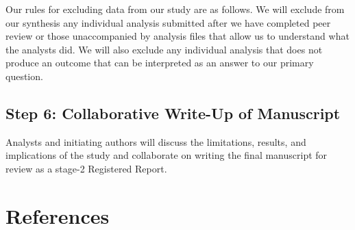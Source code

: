 \documentclass[
  english,
  man,floatsintext]{apa6}
\begin{document}
Our rules for excluding data from our study are as follows.
We will exclude from our synthesis any individual analysis submitted after we have completed peer review or those unaccompanied by analysis files that allow us to understand what the analysts did.
We will also exclude any individual analysis that does not produce an outcome that can be interpreted as an answer to our primary question.

\hypertarget{step-6-collaborative-write-up-of-manuscript}{%
\subsection{Step 6: Collaborative Write-Up of Manuscript}\label{step-6-collaborative-write-up-of-manuscript}}

Analysts and initiating authors will discuss the limitations, results, and implications of the study and collaborate on writing the final manuscript for review as a stage-2 Registered Report.

\newpage

\hypertarget{references}{%
\section{References}\label{references}}

\begingroup
\setlength{\parindent}{-0.5in}
\setlength{\leftskip}{0.5in}
\end{document}
